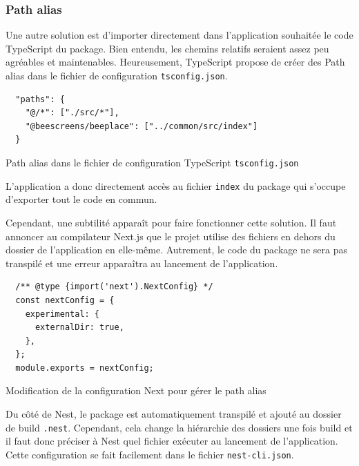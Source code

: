 \subsubsection{Path alias}

Une autre solution est d'importer directement dans l'application souhaitée le code TypeScript du package. Bien entendu, les chemins relatifs seraient assez peu agréables et maintenables. Heureusement, TypeScript propose de créer des Path alias dans le fichier de configuration \texttt{tsconfig.json}.

\begin{listing}[H]
  \begin{verbatim}
  "paths": {
    "@/*": ["./src/*"],
    "@beescreens/beeplace": ["../common/src/index"]
  }
\end{verbatim}
  \caption{Path alias dans le fichier de configuration TypeScript \texttt{tsconfig.json}}
  \label{listing:path-alias-tsconfig}
\end{listing}

L'application a donc directement accès au fichier \texttt{index} du package qui s'occupe d'exporter tout le code en commun.

Cependant, une subtilité apparaît pour faire fonctionner cette solution. Il faut annoncer au compilateur Next.js que le projet utilise des fichiers en dehors du dossier de l'application en elle-même. Autrement, le code du package ne sera pas transpilé et une erreur apparaîtra au lancement de l'application.

\begin{listing}[H]
  \begin{verbatim}
  /** @type {import('next').NextConfig} */
  const nextConfig = {
    experimental: {
      externalDir: true,
    },
  };
  module.exports = nextConfig;
\end{verbatim}
  \caption{Modification de la configuration Next pour gérer le path alias}
  \label{listing:next-external-dir}
\end{listing}

Du côté de Nest, le package est automatiquement transpilé et ajouté au dossier de build \texttt{.nest}. Cependant, cela change la hiérarchie des dossiers une fois build et il faut donc préciser à Nest quel fichier exécuter au lancement de l'application. Cette configuration se fait facilement dans le fichier \texttt{nest-cli.json}.

